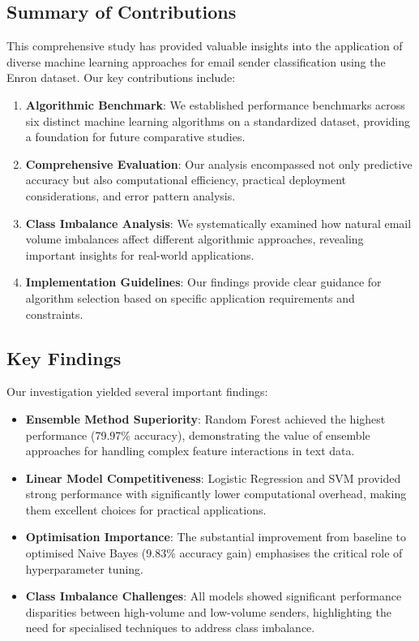 \documentclass[11pt,a4paper]{article}
\begin{document}
\subsection{Summary of Contributions}

This comprehensive study has provided valuable insights into the application of diverse machine learning approaches for email sender classification using the Enron dataset. Our key contributions include:

\begin{enumerate}
    \item \textbf{Algorithmic Benchmark}: We established performance benchmarks across six distinct machine learning algorithms on a standardized dataset, providing a foundation for future comparative studies.
    
    \item \textbf{Comprehensive Evaluation}: Our analysis encompassed not only predictive accuracy but also computational efficiency, practical deployment considerations, and error pattern analysis.
    
    \item \textbf{Class Imbalance Analysis}: We systematically examined how natural email volume imbalances affect different algorithmic approaches, revealing important insights for real-world applications.
    
    \item \textbf{Implementation Guidelines}: Our findings provide clear guidance for algorithm selection based on specific application requirements and constraints.
\end{enumerate}

\subsection{Key Findings}

Our investigation yielded several important findings:

\begin{itemize}
    \item \textbf{Ensemble Method Superiority}: Random Forest achieved the highest performance (79.97\% accuracy), demonstrating the value of ensemble approaches for handling complex feature interactions in text data.
    
    \item \textbf{Linear Model Competitiveness}: Logistic Regression and SVM provided strong performance with significantly lower computational overhead, making them excellent choices for practical applications.
    
    \item \textbf{Optimisation Importance}: The substantial improvement from baseline to optimised Naive Bayes (9.83\% accuracy gain) emphasises the critical role of hyperparameter tuning.
    
    \item \textbf{Class Imbalance Challenges}: All models showed significant performance disparities between high-volume and low-volume senders, highlighting the need for specialised techniques to address class imbalance.
\end{itemize}
\end{document}
